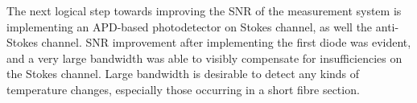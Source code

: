 \documentclass{standalone}
\begin{document}
The next logical step towards improving the SNR of the measurement system is implementing an APD-based photodetector on Stokes channel, as well the anti-Stokes channel. SNR improvement after implementing the first diode was evident, and a very large bandwidth was able to visibly compensate for insufficiencies on the Stokes channel. Large bandwidth is desirable to detect any kinds of temperature changes, especially those occurring in a short fibre section.


\setcounter{stranica}{\thepage}
\addtocounter{stranica}{1}
\end{document}
